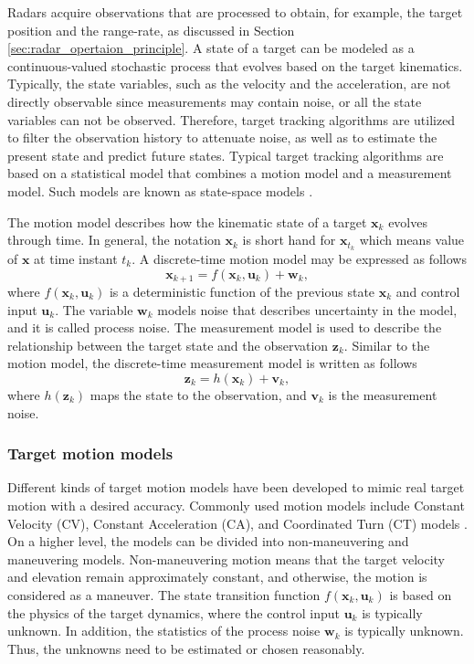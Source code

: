 \documentclass[english, 12pt, a4paper, elec, utf8, a-1b, online]{aaltothesis}
\renewcommand{\vec}[1]{\mathbf{#1}}
\newcommand{\x}{\vec{x}_k}
\newcommand{\xnext}{\vec{x}_{k+1}}
\newcommand{\z}{\vec{z}_k}
\newcommand{\cinput}{\vec{u}_k}
\newcommand{\pnoise}{\vec{w}_k}
\newcommand{\onoise}{\vec{v}_k}
\begin{document}
Radars acquire observations that are processed to obtain, for example, the target position and the range-rate, as discussed in Section \ref{sec:radar_opertaion_principle}.
A state of a target can be modeled as a continuous-valued stochastic process that evolves based on the target kinematics. 
Typically, the state variables, such as the velocity and the acceleration, are not directly observable since measurements may contain noise, or all the state variables can not be observed.
Therefore, target tracking algorithms are utilized to filter the observation history to attenuate noise, as well as to estimate the present state and predict future states.
Typical target tracking algorithms are based on a statistical model that combines a motion model and a measurement model. 
Such models are known as state-space models \cite{RongLi2003}.

The motion model describes how the kinematic state of a target $\x$ evolves through time.
In general, the notation $\x$ is short hand for $\vec{x}_{t_k}$ which means value of $\vec{x}$ at time instant $t_k$. 
A discrete-time motion model may be expressed as follows \cite{RongLi2003}
\begin{equation}\label{eq:spm_motion}
    \xnext  = f(\x, \cinput) + \pnoise,
\end{equation}
where $f(\x, \cinput)$ is a deterministic function of the previous state $\x$ and control input $\cinput$.
The variable $\pnoise$ models noise that describes uncertainty in the model, and it is called process noise.
The measurement model is used to describe the relationship between the target state and the observation $\z$. 
Similar to the motion model, the discrete-time measurement model is written as follows \cite{RongLi2003}
\begin{equation}\label{eq:spm_obs}
    \z = h(\x) + \onoise,
\end{equation}
where $h(\z)$ maps the state to the observation, and $\onoise$ is the measurement noise.

\subsubsection{Target motion models} \label{sec:target_models}

Different kinds of target motion models have been developed to mimic real target motion with a desired accuracy. 
Commonly used motion models include Constant Velocity (CV), Constant Acceleration (CA), and Coordinated Turn (CT) models \cite{RongLi2003}.
On a higher level, the models can be divided into non-maneuvering and maneuvering models. 
Non-maneuvering motion means that the target velocity and elevation remain approximately constant, and otherwise, the motion is considered as a maneuver.
The state transition function $f(\x, \cinput)$ is based on the physics of the target dynamics, where the control input $\cinput$ is typically unknown.
In addition, the statistics of the process noise $\pnoise$ is typically unknown.
Thus, the unknowns need to be estimated or chosen reasonably.
\end{document}
